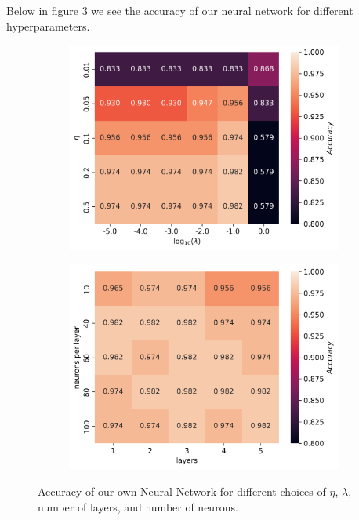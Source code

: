 \documentclass[11pt]{article}
\begin{document}
Below in figure \ref{fig:NN_cancer} we see the accuracy of our neural network for different hyperparameters.
\begin{figure}[H]
    \begin{subfigure}{.5\textwidth}
        \centering
        \includegraphics[width=\textwidth]{../figures/cancer_eta_lmb.png}
        \caption{}
        \label{fig:}
    \end{subfigure}
    \begin{subfigure}{.5\textwidth}
        \centering
        \includegraphics[width=\textwidth]{../figures/cancer_L_n_test.png}
        \caption{}
        \label{fig:}
    \end{subfigure}
    \caption{Accuracy of our own Neural Network for different choices of $\eta$, $\lambda$, number of layers, and number of neurons.}
    \label{fig:NN_cancer}
\end{figure}
\end{document}
